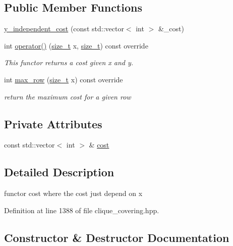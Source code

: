 \subsection*{Public Member Functions}
\begin{DoxyCompactItemize}
\item 
\hyperlink{structy__independent__cost_a94a4c428f68df86f1d9eee0d8f09bccb}{y\+\_\+independent\+\_\+cost} (const std\+::vector$<$ int $>$ \&\+\_\+cost)
\item 
int \hyperlink{structy__independent__cost_a887fe6ac33c423e279ef34c2205ac5ad}{operator()} (\hyperlink{tutorial__fpt__2017_2intro_2sixth_2test_8c_a7c94ea6f8948649f8d181ae55911eeaf}{size\+\_\+t} x, \hyperlink{tutorial__fpt__2017_2intro_2sixth_2test_8c_a7c94ea6f8948649f8d181ae55911eeaf}{size\+\_\+t}) const override
\begin{DoxyCompactList}\small\item\em This functor returns a cost given x and y. \end{DoxyCompactList}\item 
int \hyperlink{structy__independent__cost_a9a70cf0455c1c8425279cfdcd04a6be6}{max\+\_\+row} (\hyperlink{tutorial__fpt__2017_2intro_2sixth_2test_8c_a7c94ea6f8948649f8d181ae55911eeaf}{size\+\_\+t} x) const override
\begin{DoxyCompactList}\small\item\em return the maximum cost for a given row \end{DoxyCompactList}\end{DoxyCompactItemize}
\subsection*{Private Attributes}
\begin{DoxyCompactItemize}
\item 
const std\+::vector$<$ int $>$ \& \hyperlink{structy__independent__cost_ac236094780354c67d4f5ef1674c7ae03}{cost}
\end{DoxyCompactItemize}


\subsection{Detailed Description}
functor cost where the cost just depend on x 

Definition at line 1388 of file clique\+\_\+covering.\+hpp.



\subsection{Constructor \& Destructor Documentation}
\mbox{\label{structy__independent__cost_a94a4c428f68df86f1d9eee0d8f09bccb}} 
